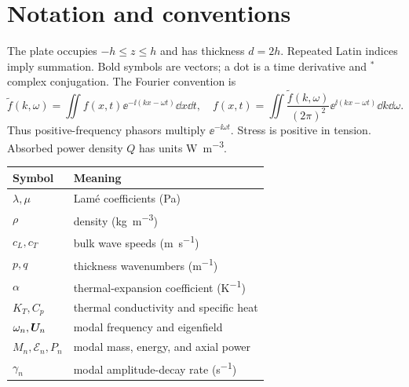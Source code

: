 \chapter*{Notation and conventions}
The plate occupies $-h\le z\le h$ and has thickness $d=2h$. Repeated Latin
indices imply summation. Bold symbols are vectors; a dot is a time derivative
and ${}^*$ complex conjugation. The Fourier convention is
\begin{equation}
 \widetilde f(k,\omega)=\iint f(x,t)\ee^{-\ii(kx-\omega t)}\dd x\dd t,
 \quad f(x,t)=\iint\frac{\widetilde f(k,\omega)}{(2\pi)^2}
 \ee^{\ii(kx-\omega t)}\dd k\dd\omega.\label{eq:fourier-convention}
\end{equation}
Thus positive-frequency phasors multiply $\ee^{-\ii\omega t}$. Stress is
positive in tension. Absorbed power density $Q$ has units \si{W.m^{-3}}.
\begin{center}\begin{tabular}{@{}ll@{}}\toprule
Symbol&Meaning\\\midrule
$\lambda,\mu$&Lam\'e coefficients (\si{Pa})\\
$\rho$&density (\si{kg.m^{-3}})\\
$c_L,c_T$&bulk wave speeds (\si{m.s^{-1}})\\
$p,q$&thickness wavenumbers (\si{m^{-1}})\\
$\alpha$&thermal-expansion coefficient (\si{K^{-1}})\\
$K_T,C_p$&thermal conductivity and specific heat\\
$\omega_n,\bm{U}_n$&modal frequency and eigenfield\\
$M_n,\mathcal E_n,P_n$&modal mass, energy, and axial power\\
$\gamma_n$&modal amplitude-decay rate (\si{s^{-1}})\\\bottomrule
\end{tabular}\end{center}
